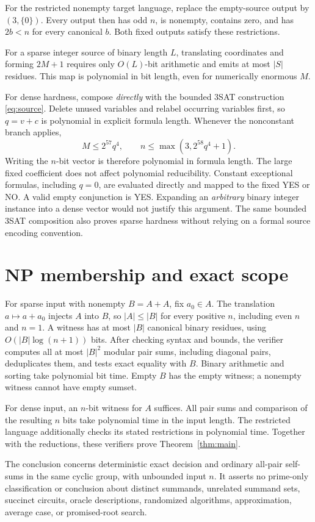 \documentclass[11pt]{article}
\begin{document}
For the restricted nonempty target language, replace the empty-source output by $(3,\{0\})$. Every output then has odd $n$, is nonempty, contains zero, and has $2b<n$ for every canonical $b$. Both fixed outputs satisfy these restrictions.

For a sparse integer source of binary length $L$, translating coordinates and forming $2M+1$ requires only $O(L)$-bit arithmetic and emits at most $|S|$ residues. This map is polynomial in bit length, even for numerically enormous $M$.

For dense hardness, compose \emph{directly} with the bounded 3SAT construction \eqref{eq:source}. Delete unused variables and relabel occurring variables first, so $q=v+c$ is polynomial in explicit formula length. Whenever the nonconstant branch applies,
\[
 M\leq2^{57}q^4,\qquad n\leq\max(3,2^{58}q^4+1).
\]
Writing the $n$-bit vector is therefore polynomial in formula length. The large fixed coefficient does not affect polynomial reducibility. Constant exceptional formulas, including $q=0$, are evaluated directly and mapped to the fixed YES or NO. A valid empty conjunction is YES. Expanding an \emph{arbitrary} binary integer instance into a dense vector would not justify this argument. The same bounded 3SAT composition also proves sparse hardness without relying on a formal source encoding convention.

\section{NP membership and exact scope}
For sparse input with nonempty $B=A+A$, fix $a_0\in A$. The translation $a\mapsto a+a_0$ injects $A$ into $B$, so $|A|\leq|B|$ for every positive $n$, including even $n$ and $n=1$. A witness has at most $|B|$ canonical binary residues, using $O(|B|\log(n+1))$ bits. After checking syntax and bounds, the verifier computes all at most $|B|^2$ modular pair sums, including diagonal pairs, deduplicates them, and tests exact equality with $B$. Binary arithmetic and sorting take polynomial bit time. Empty $B$ has the empty witness; a nonempty witness cannot have empty sumset.

For dense input, an $n$-bit witness for $A$ suffices. All pair sums and comparison of the resulting $n$ bits take polynomial time in the input length. The restricted language additionally checks its stated restrictions in polynomial time. Together with the reductions, these verifiers prove Theorem~\ref{thm:main}.

The conclusion concerns deterministic exact decision and ordinary all-pair self-sums in the same cyclic group, with unbounded input $n$. It asserts no prime-only classification or conclusion about distinct summands, unrelated summand sets, succinct circuits, oracle descriptions, randomized algorithms, approximation, average case, or promised-root search.
\end{document}
